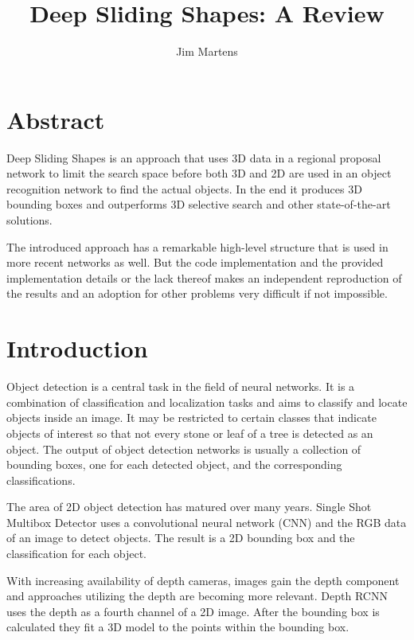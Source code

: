 \documentclass[12pt]{scrartcl}
\begin{document}
\title{Deep Sliding Shapes: A Review}
\author{Jim Martens}

\maketitle
\section*{Abstract}

Deep Sliding Shapes is an approach that uses 3D data in a regional proposal
network to limit the search space before both 3D and 2D are used in an object
recognition network to find the actual objects. In the end it produces 3D
bounding boxes and outperforms 3D selective search and other state-of-the-art
solutions.

The introduced approach has a remarkable high-level structure that is
used in more recent networks as well. But the code implementation and the
provided implementation details or the lack thereof makes an independent
reproduction of the results and an adoption for other problems very difficult
if not impossible.


\clearpage

\section{Introduction}

Object detection is a central task in the field of neural networks. It is a
combination of classification and localization tasks and aims to classify
and locate objects inside an image. It may be restricted to certain classes
that indicate objects of interest so that not every stone or leaf of a tree
is detected as an object. The output of object detection networks is usually
a collection of bounding boxes, one for each detected object, and the corresponding
classifications.

The area of 2D object detection has matured over many years. Single Shot Multibox
Detector\cite{Liu2016} uses a convolutional neural network (CNN) and the RGB
data of an image to detect objects. The result is a 2D bounding box and the
classification for each object.

With increasing availability of depth cameras, images gain the depth component
and approaches utilizing the depth are becoming more relevant. Depth RCNN\cite{Gupta2015}
uses the depth as a fourth channel of a 2D image. After the bounding box
is calculated they fit a 3D model to the points within the bounding box.
\end{document}

